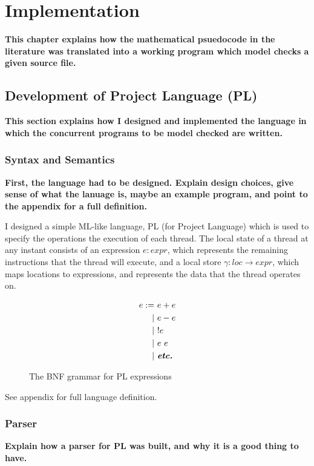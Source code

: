 \documentclass[12pt,a4paper,twoside,openright]{report}
\begin{document}
\chapter{Implementation}
\textbf{This chapter explains how the mathematical
	psuedocode in the literature was translated
	into a working program which model checks a
	given source file.}

\section{Development of Project Language (PL)}
\textbf{This section explains how I designed
	and implemented the language in which the
	concurrent programs to be model checked
	are written.}

\subsection{Syntax and Semantics}
\textbf{First, the language had to be designed.
	Explain design choices, give sense of what
	the lanuage is, maybe an example program,
	and point to the appendix for a full definition.}

I designed a simple ML-like language, PL (for 
Project Language) which
is used to specify the operations the execution
of each thread. The local state of a thread at
any instant consists of an expression
$e : \textit{expr}$, which
represents the remaining instructions that the
thread will execute, and a local store
$\gamma : \textit{loc} \to \textit{expr}$, which
maps locations to expressions, and represents the
data that the thread operates on.

\begin{figure}
	\begin{align*}
		e := &\ e + e \\
		\vert &\ e - e \\
		\vert &\ !e \\
		\vert &\ e\ e \\
		\vert &\ \textbf{\textit{etc.}}
	\end{align*}
	\caption{The BNF grammar for PL expressions}
\end{figure}

See appendix for full language definition.

\subsection{Parser}
\textbf{Explain how a parser for PL was built,
	and why it is a good thing to have.}
\end{document}
